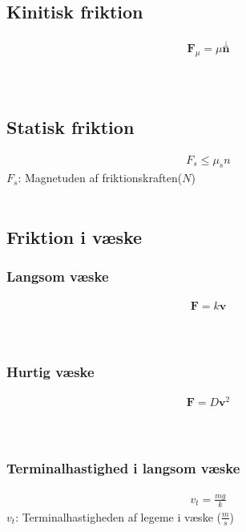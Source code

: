 \subsection{Kinitisk friktion}
	\begin{align}
		\mathbf{F}_\mu=\mu\stackrel{\bot}{\mathbf{n}}
	\end{align}
	\Kraft\\
	\friktion\\
	\Norm

\subsection{Statisk friktion}
	\begin{align}
		F_s\leq\mu_sn
	\end{align}
	$F_s$: Magnetuden af friktionskraften($N$)\\
	\friktion\\
	\norm

\subsection{Friktion i væske}
	\subsubsection{Langsom væske}
		\begin{align}
			\mathbf{F}=k\mathbf{v}
		\end{align}
		\Kraft\\
		\langveskfriktion\\
		\Vel

	\subsubsection{Hurtig væske}
		\begin{align}
			\mathbf{F}=D\mathbf{v}^2
		\end{align}
		\Kraft\\
		\langveskfriktion\\
		\Vel

	\subsubsection{Terminalhastighed i langsom væske}
		\begin{align}
			v_t=\frac{mg}{k}
		\end{align}
		$v_t$: Terminalhastigheden af legeme i væske ($\frac{m}{s}$)\\
		\langveskfriktion\\
		\masse\\
		\tyngde

